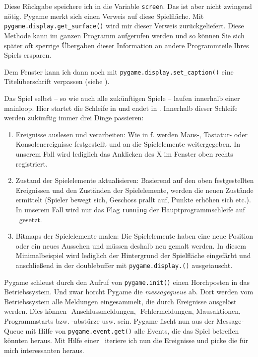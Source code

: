 Diese Rückgabe speichere ich in die Variable \texttt{screen}. Das ist aber nicht zwingend nötig. Pygame merkt sich einen Verweis auf diese Spielfläche. Mit \texttt{pygame\-.dis\-play\-.get\-\_sur\-face()} wird mir dieser Verweis zurückgeliefert. Diese Methode kann im ganzen Programm aufgerufen werden und so können Sie sich später oft sperrige Übergaben dieser Information an andere Programmteile Ihres Spiels ersparen.

Dem Fenster kann ich dann noch mit \texttt{pygame.display.set\_caption()} eine Titelüberschrift verpassen (siehe ).

Das Spiel selbst -- so wie auch alle zukünftigen Spiele -- laufen innerhalb einer \Gls{mainloop}. Hier startet die Schleife in  und endet in . Innerhalb dieser Schleife werden zukünftig immer drei Dinge passieren: 
\begin{enumerate}
	\item Ereignisse auslesen und verarbeiten: Wie in f. werden Maus-, Tastatur- oder Konsolenereignisse festgestellt und an die Spielelemente weitergegeben. In unserem Fall wird lediglich das Anklicken des X im Fenster oben rechts registriert.  
	\item Zustand der Spielelemente aktualisieren: Basierend auf den oben festgestellten Ereignissen und den Zuständen der Spielelemente, werden die neuen Zustände ermittelt (Spieler bewegt sich, Geschoss prallt auf, Punkte erhöhen sich etc.). In unserem Fall wird nur das Flag \texttt{running} der Hauptprogrammschleife auf \false\ gesetzt.
	\item Bitmaps der Spielelemente malen: Die Spielelemente haben eine neue Position oder ein neues Aussehen und müssen deshalb neu gemalt werden. In diesem Minimalbeispiel wird lediglich  der Hintergrund der Spielfläche eingefärbt und anschließend in  der \Gls{doublebuffer} mit \texttt{pygame.display.()} ausgetauscht.
\end{enumerate}

Pygame schleust durch den Aufruf von \texttt{py\-game.\-init()} einen Horchposten in das Betriebssystem. Und zwar horcht Pygame die \emph{\Gls{messagequeue}} ab. Dort werden vom Betriebssystem alle Meldungen eingesammelt, die durch Ereignisse ausgelöst werden. Dies können -An\-schluss\-mel\-dungen, -Fehlermeldungen, Mausaktionen, Programmstarts bzw. -abstürze  usw. sein. Pygame fischt nun aus der Message-Queue mit Hilfe von \texttt{pygame.event.get()} alle Events, die das Spiel betreffen könnten heraus. Mit Hilfe einer \forSchleife\ iteriere ich nun die Ereignisse und picke die für mich interessanten heraus. 

